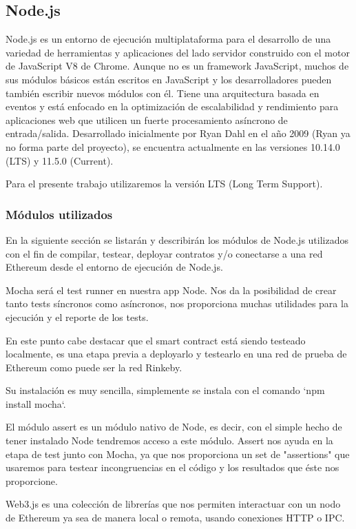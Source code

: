 \subsection{Node.js}
Node.js es un entorno de ejecución multiplataforma para el desarrollo de una variedad de
herramientas y aplicaciones del lado servidor construido con el motor de JavaScript V8 de Chrome.
Aunque no es un framework JavaScript, muchos de sus módulos básicos están escritos en JavaScript y
los desarrolladores pueden también escribir nuevos módulos con él. Tiene una arquitectura basada en
eventos y está enfocado en la optimización de escalabilidad y rendimiento para aplicaciones web que
utilicen un fuerte procesamiento asíncrono de entrada/salida. Desarrollado inicialmente por Ryan
Dahl en el año 2009 (Ryan ya no forma parte del proyecto), se encuentra actualmente en las
versiones 10.14.0 (LTS) y 11.5.0 (Current).

Para el presente trabajo utilizaremos la versión LTS (Long Term Support).


\subsubsection{Módulos utilizados}
En la siguiente sección se listarán y describirán los módulos de Node.js utilizados con el fin de
compilar, testear, deployar contratos y/o conectarse a una red Ethereum desde el entorno de
ejecución de Node.js.

Mocha será el test runner en nuestra app Node. Nos da la posibilidad de crear tanto tests síncronos
como asíncronos, nos proporciona muchas utilidades para la ejecución y el reporte de los tests.

En este punto cabe destacar que el smart contract está siendo testeado localmente, es una etapa
previa a deployarlo y testearlo en una red de prueba de Ethereum como puede ser la red Rinkeby.

Su instalación es muy sencilla, simplemente se instala con el comando `npm install mocha`.


El módulo assert es un módulo nativo de Node, es decir, con el simple hecho de tener instalado
Node tendremos acceso a este módulo. Assert nos ayuda en la etapa de test junto con Mocha, ya que 
nos proporciona un set de "assertions" que usaremos para testear incongruencias en el código
y los resultados que éste nos proporcione.

Web3.js es una colección de librerías que nos permiten interactuar con un nodo de Ethereum 
ya sea de manera local o remota, usando conexiones HTTP o IPC.

